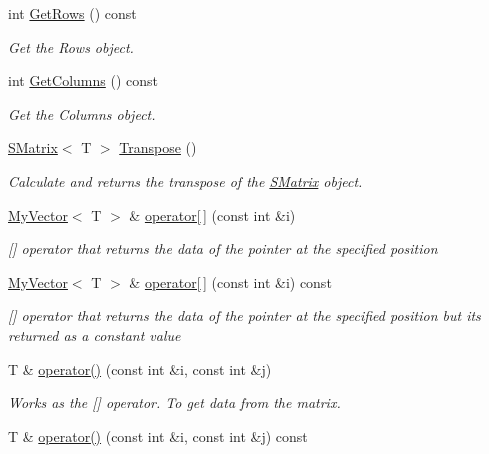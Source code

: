 \begin{DoxyCompactItemize}
int \mbox{\hyperlink{class_s_matrix_ae118c3b246ed5418eadd8f687ec449e2}{Get\+Rows}} () const
\begin{DoxyCompactList}\small\item\em Get the Rows object. \end{DoxyCompactList}\item 
int \mbox{\hyperlink{class_s_matrix_a5933f5269b187ef02e892de067c09481}{Get\+Columns}} () const
\begin{DoxyCompactList}\small\item\em Get the Columns object. \end{DoxyCompactList}\item 
\mbox{\hyperlink{class_s_matrix}{S\+Matrix}}$<$ T $>$ \mbox{\hyperlink{class_s_matrix_a55030aa83eaefc452d2fdf28fc38391c}{Transpose}} ()
\begin{DoxyCompactList}\small\item\em Calculate and returns the transpose of the \mbox{\hyperlink{class_s_matrix}{S\+Matrix}} object. \end{DoxyCompactList}\item 
\mbox{\hyperlink{class_my_vector}{My\+Vector}}$<$ T $>$ \& \mbox{\hyperlink{class_s_matrix_ab2092e3019526cd318f80731d7a226b5}{operator\mbox{[}$\,$\mbox{]}}} (const int \&i)
\begin{DoxyCompactList}\small\item\em \mbox{[}\mbox{]} operator that returns the data of the pointer at the specified position \end{DoxyCompactList}\item 
\mbox{\hyperlink{class_my_vector}{My\+Vector}}$<$ T $>$ \& \mbox{\hyperlink{class_s_matrix_ac67a58ec51953390848c0728dd070bf8}{operator\mbox{[}$\,$\mbox{]}}} (const int \&i) const
\begin{DoxyCompactList}\small\item\em \mbox{[}\mbox{]} operator that returns the data of the pointer at the specified position but its returned as a constant value \end{DoxyCompactList}\item 
T \& \mbox{\hyperlink{class_s_matrix_a23038e6371f572bc37c4aec7fe415536}{operator()}} (const int \&i, const int \&j)
\begin{DoxyCompactList}\small\item\em Works as the \mbox{[}\mbox{]} operator. To get data from the matrix. \end{DoxyCompactList}\item 
T \& \mbox{\hyperlink{class_s_matrix_a9255f1dbcfefeff621616f8495215c3d}{operator()}} (const int \&i, const int \&j) const

\end{DoxyCompactItemize}
